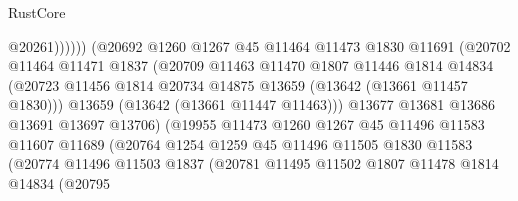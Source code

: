 \begin{lexlean}{RustCore}
\begin{coremodule}
                                        @20261))))))
                            (@20692
                              @1260
                              @1267
                              @45
                              @11464
                              @11473
                              @1830
                              @11691
                              (@20702
                                @11464
                                @11471
                                @1837
                                (@20709
                                  @11463
                                  @11470
                                  @1807
                                  @11446
                                  @1814
                                  @14834
                                  (@20723
                                    @11456
                                    @1814
                                    @20734
                                    @14875
                                    @13659
                                    (@13642 (@13661 @11457 @1830)))
                                  @13659
                                  (@13642 (@13661 @11447 @11463)))
                                @13677
                                @13681
                                @13686
                                @13691
                                @13697
                                @13706)
                              (@19955
                                @11473
                                @1260
                                @1267
                                @45
                                @11496
                                @11583
                                @11607
                                @11689
                                (@20764
                                  @1254
                                  @1259
                                  @45
                                  @11496
                                  @11505
                                  @1830
                                  @11583
                                  (@20774
                                    @11496
                                    @11503
                                    @1837
                                    (@20781
                                      @11495
                                      @11502
                                      @1807
                                      @11478
                                      @1814
                                      @14834
                                      (@20795

\end{coremodule}
\end{lexlean}
